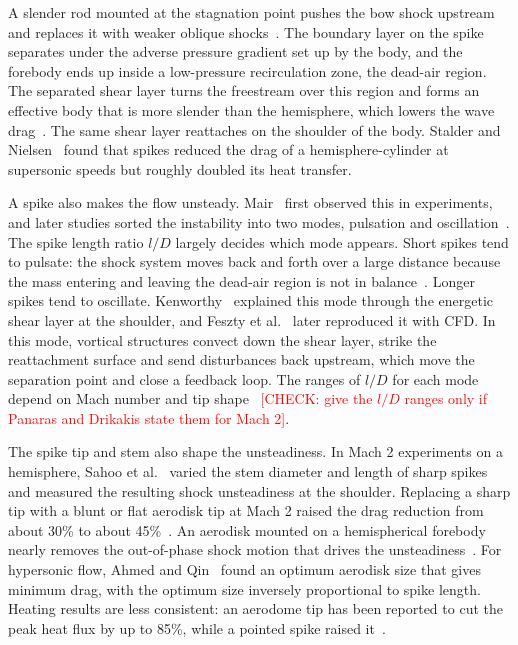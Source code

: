 \documentclass[11pt,a4paper]{article}
\newcommand{\chk}[1]{\textcolor{red}{[#1]}}
\begin{document}
A slender rod mounted at the stagnation point pushes the bow shock upstream and replaces it with weaker oblique shocks~\cite{Ahmed2011recent,Sahoo2016effect}. The boundary layer on the spike separates under the adverse pressure gradient set up by the body, and the forebody ends up inside a low-pressure recirculation zone, the dead-air region. The separated shear layer turns the freestream over this region and forms an effective body that is more slender than the hemisphere, which lowers the wave drag~\cite{Ahmed2010drag}. The same shear layer reattaches on the shoulder of the body. Stalder and Nielsen~\cite{Stalder1954heat} found that spikes reduced the drag of a hemisphere-cylinder at supersonic speeds but roughly doubled its heat transfer.

A spike also makes the flow unsteady. Mair~\cite{Mair1952lxviii} first observed this in experiments, and later studies sorted the instability into two modes, pulsation and oscillation~\cite{Feszty2004driving,Panaras2009highspeed}. The spike length ratio $l/D$ largely decides which mode appears. Short spikes tend to pulsate: the shock system moves back and forth over a large distance because the mass entering and leaving the dead-air region is not in balance~\cite{Feszty2004driving,Feszty2000numerical}. Longer spikes tend to oscillate. Kenworthy~\cite{Kenworthy1978study} explained this mode through the energetic shear layer at the shoulder, and Feszty et al.~\cite{Feszty2002utilising} later reproduced it with CFD. In this mode, vortical structures convect down the shear layer, strike the reattachment surface and send disturbances back upstream, which move the separation point and close a feedback loop. The ranges of $l/D$ for each mode depend on Mach number and tip shape~\cite{Panaras2009highspeed} \chk{CHECK: give the $l/D$ ranges only if Panaras and Drikakis state them for Mach 2}.

The spike tip and stem also shape the unsteadiness. In Mach 2 experiments on a hemisphere, Sahoo et al.~\cite{Sahoo2020parametric} varied the stem diameter and length of sharp spikes and measured the resulting shock unsteadiness at the shoulder. Replacing a sharp tip with a blunt or flat aerodisk tip at Mach 2 raised the drag reduction from about 30\% to about 45\%~\cite{Sahoo2016effect}. An aerodisk mounted on a hemispherical forebody nearly removes the out-of-phase shock motion that drives the unsteadiness~\cite{Sahoo2020shock}. For hypersonic flow, Ahmed and Qin~\cite{Ahmed2010drag} found an optimum aerodisk size that gives minimum drag, with the optimum size inversely proportional to spike length. Heating results are less consistent: an aerodome tip has been reported to cut the peak heat flux by up to 85\%, while a pointed spike raised it~\cite{Gauer2008numerical,Yadav2018numerical}.
\end{document}

